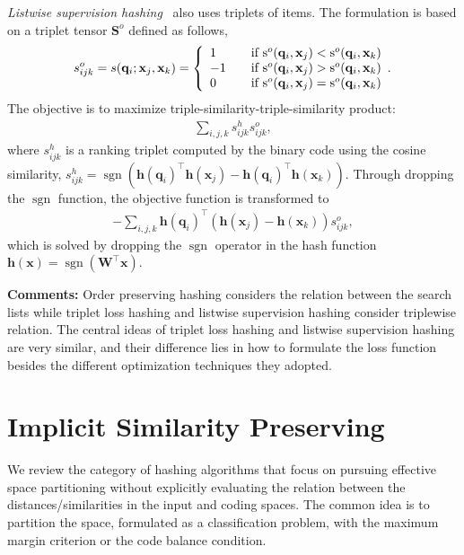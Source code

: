 \documentclass[10pt,journal,compsoc]{IEEEtran}
\begin{document}
\emph{Listwise supervision hashing}~\cite{WangLSJ13} also uses triplets of items.
The formulation is based on a triplet tensor $\mathbf{S}^o$ defined as follows,
\begin{equation}
s^o_{ijk} = s(\mathbf{q}_i; \mathbf{x}_j, \mathbf{x}_k)
= \left\{ \begin{array}{l l}
     1 & \quad \text{if $\operatorname{s}^o(\mathbf{q}_i, \mathbf{x}_j) <  \operatorname{s}^o(\mathbf{q}_i, \mathbf{x}_k)$}\\
     -1 & \quad \text{if $\operatorname{s}^o(\mathbf{q}_i, \mathbf{x}_j) >  \operatorname{s}^o(\mathbf{q}_i, \mathbf{x}_k)$}\\
     0 & \quad \text{if $\operatorname{s}^o(\mathbf{q}_i, \mathbf{x}_j) =  \operatorname{s}^o(\mathbf{q}_i, \mathbf{x}_k)$}\\
   \end{array}. \right. \nonumber
\end{equation}
The objective is to maximize triple-similarity-triple-similarity product:
\begin{align}
\sum\nolimits_{i,j,k}s^h_{ijk}s^o_{ijk},
\end{align}
where $s^h_{ijk}$ is a ranking triplet computed by the binary code using the cosine similarity,
$s^h_{ijk} = \operatorname{sgn}(\mathbf{h}(\mathbf{q}_i)^\top\mathbf{h}(\mathbf{x}_j) - \mathbf{h}(\mathbf{q}_i)^\top\mathbf{h}(\mathbf{x}_k))$.
Through dropping the $\operatorname{sgn}$ function,
the objective function is transformed to
\begin{align}
-\sum\nolimits_{i, j, k} \mathbf{h}(\mathbf{q}_i)^\top(\mathbf{h}(\mathbf{x}_j) - \mathbf{h}(\mathbf{x}_k))s^o_{ijk},
\end{align}
which is solved by dropping the $\operatorname{sgn}$ operator in the hash function
$\mathbf{h}(\mathbf{x}) = \operatorname{sgn}(\mathbf{W}^\top\mathbf{x})$.




\textbf{Comments:}
Order preserving hashing considers the relation between the search lists
while triplet loss hashing and listwise supervision hashing consider triplewise relation.
The central ideas of triplet loss hashing and listwise supervision hashing
are very similar,
and their difference lies in how to formulate the loss function
besides the different optimization techniques they adopted.



\section{Implicit Similarity Preserving}
\label{sec:implicit}
We review the category of hashing algorithms
that focus on pursuing effective space partitioning
without explicitly
evaluating the relation between the distances/similarities
in the input and coding spaces.
The common idea is
to partition the space,
formulated as a classification problem,
with the maximum margin criterion
or the code balance condition.
\end{document}
